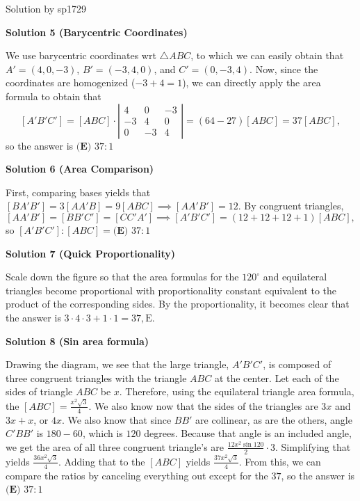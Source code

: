 \begin{enumerate}
 Solution by sp1729

 



\textbf{Solution 5 (Barycentric Coordinates)}

We use barycentric coordinates wrt $\triangle ABC$, to which we can easily obtain that $A'=(4,0,-3)$, $B'=(-3,4,0)$, and $C'=(0,-3,4)$. Now, since the coordinates are homogenized ($-3+4=1$), we can directly apply the area formula to obtain that
 \[[A'B'C']=[ABC]\cdot\left| \begin{array}{ccc} 4 & 0 & -3 \\ -3 & 4 & 0 \\ 0 & -3 & 4 \end{array} \right| = (64-27)[ABC]=37[ABC],\]so the answer is $\boxed{\textbf{(E) } 37:1}$




\textbf{Solution 6 (Area Comparison)}

First, comparing bases yields that $[BA'B']=3[AA'B]=9[ABC]\implies [AA'B']=12$. By congruent triangles, 
 \[[AA'B']=[BB'C']=[CC'A']\implies [A'B'C']=(12+12+12+1)[ABC],\]so $[A'B'C']:[ABC]=\boxed{\textbf{(E) } 37:1}$




\textbf{Solution 7 (Quick Proportionality)}

Scale down the figure so that the area formulas for the $120^\circ$ and equilateral triangles become proportional with proportionality constant equivalent to the product of the corresponding sides. By the proportionality, it becomes clear that the answer is $3\cdot4\cdot3+1\cdot1=37, \boxed{\text{E}}$.

 



\textbf{Solution 8 (Sin area formula)}

Drawing the diagram, we see that the large triangle, $A'B'C'$, is composed of three congruent triangles with the triangle $ABC$ at the center. Let each of the sides of triangle $ABC$ be $x$. Therefore, using the equilateral triangle area formula, the $[ABC] = \frac{x^2\sqrt{3}}{4}$. We also know now that the sides of the triangles are $3x$ and $3x + x$, or $4x$. We also know that since $BB'$ are collinear, as are the others, angle $C'BB'$ is $180 - 60$, which is $120$ degrees. Because that angle is an included angle, we get the area of all three congruent triangle's are $\frac{12x^2\sin120}{2} \cdot 3$. Simplifying that yields $\frac{36x^2\sqrt{3}}{4}$. Adding that to the $[ABC]$ yields $\frac{37x^2\sqrt{3}}{4}$. From this, we can compare the ratios by canceling everything out except for the $37$, so the answer is $\boxed{\textbf{(E) }37:1}$





\end{enumerate}
